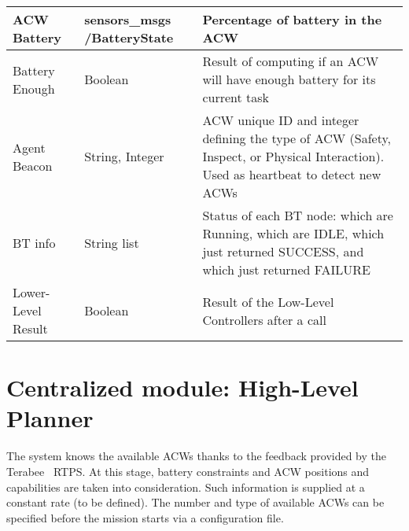 \begin{table}[htb]
\begin{tabular}{|p{}|p{}|p{}|}
      \gls{ACW} Battery & sensors\_msgs /BatteryState & Percentage of battery in the \gls{ACW}\\ \hline
      
      Battery Enough & Boolean & Result of computing if an \gls{ACW} will have enough battery for its current task \\ \hline
      
      Agent Beacon & String, Integer & \gls{ACW} unique ID and integer defining the type of \gls{ACW} (Safety, Inspect, or Physical Interaction). Used as heartbeat to detect new \glspl{ACW} \\ \hline
      
      \gls{BT} info & String list & Status of each \gls{BT} node: which are Running, which are IDLE, which just returned SUCCESS, and which just returned FAILURE \\ \hline
      
      Lower-Level Result & Boolean & Result of the Low-Level Controllers after a call \\ \hline
      
    \end{tabular}
\end{table}

\section{Centralized module: High-Level Planner}
\label{sec:Centralized module:TaskPlanner}


The system knows the available \glspl{ACW} thanks to the feedback provided by the Terabee~ \gls{RTPS}. At this stage, battery constraints and \gls{ACW} positions and capabilities are taken into consideration. Such information is supplied at a constant rate (to be defined). The number and type of available \glspl{ACW} can be specified before the mission starts via a configuration file. 


